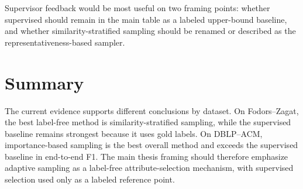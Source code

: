\documentclass[11pt]{article}
\begin{document}
Supervisor feedback would be most useful on two framing points: whether supervised should remain in the main table as a labeled upper-bound baseline, and whether similarity-stratified sampling should be renamed or described as the representativeness-based sampler.

\section{Summary}

The current evidence supports different conclusions by dataset. On Fodors--Zagat, the best label-free method is similarity-stratified sampling, while the supervised baseline remains strongest because it uses gold labels. On DBLP--ACM, importance-based sampling is the best overall method and exceeds the supervised baseline in end-to-end F1. The main thesis framing should therefore emphasize adaptive sampling as a label-free attribute-selection mechanism, with supervised selection used only as a labeled reference point.
\end{document}
